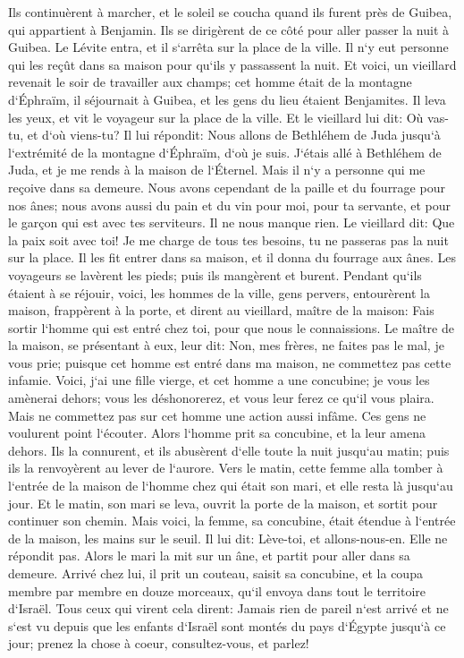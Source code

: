 \verse Ils continuèrent à marcher, et le soleil se coucha quand ils furent près de Guibea, qui appartient à Benjamin. 
\verse Ils se dirigèrent de ce côté pour aller passer la nuit à Guibea. Le Lévite entra, et il s`arrêta sur la place de la ville. Il n`y eut personne qui les reçût dans sa maison pour qu`ils y passassent la nuit. 
\verse Et voici, un vieillard revenait le soir de travailler aux champs; cet homme était de la montagne d`Éphraïm, il séjournait à Guibea, et les gens du lieu étaient Benjamites. 
\verse Il leva les yeux, et vit le voyageur sur la place de la ville. Et le vieillard lui dit: Où vas-tu, et d`où viens-tu? 
\verse Il lui répondit: Nous allons de Bethléhem de Juda jusqu`à l`extrémité de la montagne d`Éphraïm, d`où je suis. J`étais allé à Bethléhem de Juda, et je me rends à la maison de l`Éternel. Mais il n`y a personne qui me reçoive dans sa demeure. 
\verse Nous avons cependant de la paille et du fourrage pour nos ânes; nous avons aussi du pain et du vin pour moi, pour ta servante, et pour le garçon qui est avec tes serviteurs. Il ne nous manque rien. 
\verse Le vieillard dit: Que la paix soit avec toi! Je me charge de tous tes besoins, tu ne passeras pas la nuit sur la place. 
\verse Il les fit entrer dans sa maison, et il donna du fourrage aux ânes. Les voyageurs se lavèrent les pieds; puis ils mangèrent et burent. 
\verse Pendant qu`ils étaient à se réjouir, voici, les hommes de la ville, gens pervers, entourèrent la maison, frappèrent à la porte, et dirent au vieillard, maître de la maison: Fais sortir l`homme qui est entré chez toi, pour que nous le connaissions. 
\verse Le maître de la maison, se présentant à eux, leur dit: Non, mes frères, ne faites pas le mal, je vous prie; puisque cet homme est entré dans ma maison, ne commettez pas cette infamie. 
\verse Voici, j`ai une fille vierge, et cet homme a une concubine; je vous les amènerai dehors; vous les déshonorerez, et vous leur ferez ce qu`il vous plaira. Mais ne commettez pas sur cet homme une action aussi infâme. 
\verse Ces gens ne voulurent point l`écouter. Alors l`homme prit sa concubine, et la leur amena dehors. Ils la connurent, et ils abusèrent d`elle toute la nuit jusqu`au matin; puis ils la renvoyèrent au lever de l`aurore. 
\verse Vers le matin, cette femme alla tomber à l`entrée de la maison de l`homme chez qui était son mari, et elle resta là jusqu`au jour. 
\verse Et le matin, son mari se leva, ouvrit la porte de la maison, et sortit pour continuer son chemin. Mais voici, la femme, sa concubine, était étendue à l`entrée de la maison, les mains sur le seuil. 
\verse Il lui dit: Lève-toi, et allons-nous-en. Elle ne répondit pas. Alors le mari la mit sur un âne, et partit pour aller dans sa demeure. 
\verse Arrivé chez lui, il prit un couteau, saisit sa concubine, et la coupa membre par membre en douze morceaux, qu`il envoya dans tout le territoire d`Israël. 
\verse Tous ceux qui virent cela dirent: Jamais rien de pareil n`est arrivé et ne s`est vu depuis que les enfants d`Israël sont montés du pays d`Égypte jusqu`à ce jour; prenez la chose à coeur, consultez-vous, et parlez! 

